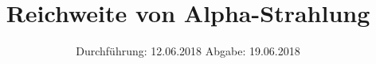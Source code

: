 
\usepackage{longtable}
\usepackage{wrapfig}
\usepackage{ dsfont }
\subject{VERSUCH 701}
\title{Reichweite von Alpha-Strahlung}
\date{%
  \hspace{-2.5em}
  Durchführung: 12.06.2018
  \hspace{4em}
  Abgabe: 19.06.2018
}


  \setlength{\parindent}{0em}
  \maketitle
  \thispagestyle{empty}
  \newpage
  \tableofcontents
  \newpage





\printbibliography{}



